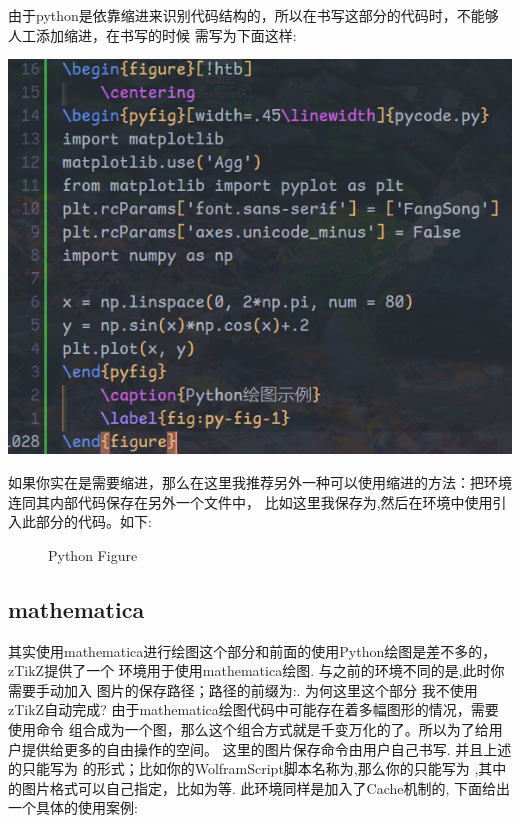 \begin{remark}
由于python是依靠缩进来识别代码结构的，所以在书写这部分的代码时，不能够人工添加缩进，在书写的时候
需写为下面这样:
\begin{center}
    \includegraphics[width=.45\linewidth]{./pics/pyfig_example.png}
\end{center}

如果你实在是需要缩进，那么在这里我推荐另外一种可以使用缩进的方法：把环境连同其内部代码保存在另外一个文件中，
比如这里我保存为,然后在环境中使用\cmd{}引入此部分的代码。如下:
\begin{codeprint}
\begin{figure}
    \centering
    
    \caption{Python Figure}
    \label{fig:pyfig-1}
\end{figure}
\end{codeprint}
\end{remark}


\subsection{mathematica}
其实使用mathematica进行绘图这个部分和前面的使用Python绘图是差不多的，zTikZ提供了一个
环境用于使用mathematica绘图. 与之前的环境不同的是,此时你需要手动加入
图片的保存路径；路径的前缀为:. 为何这里这个部分
我不使用zTikZ自动完成? 由于mathematica绘图代码中可能存在着多幅图形的情况，需要使用命令
组合成为一个图，那么这个组合方式就是千变万化的了。所以为了给用户提供给更多的自由操作的空间。
这里的图片保存命令由用户自己书写. 并且上述的只能写为
的形式；比如你的WolframScript脚本名称为,那么你的只能写为
,其中的图片格式可以自己指定，比如为等. 此环境同样是加入了Cache机制的,
下面给出一个具体的使用案例:

